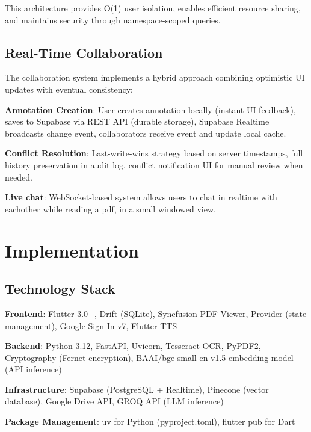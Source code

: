 \documentclass[conference]{IEEEtran}
\begin{document}
This architecture provides O(1) user isolation, enables efficient resource sharing, and maintains security through namespace-scoped queries.

\subsection{Real-Time Collaboration}

The collaboration system implements a hybrid approach combining optimistic UI updates with eventual consistency:

\textbf{Annotation Creation}: User creates annotation locally (instant UI feedback), saves to Supabase via REST API (durable storage), Supabase Realtime broadcasts change event, collaborators receive event and update local cache.

\textbf{Conflict Resolution}: Last-write-wins strategy based on server timestamps, full history preservation in audit log, conflict notification UI for manual review when needed.

\textbf{Live chat}: WebSocket-based system allows users to chat in realtime with eachother while reading a pdf, in a small windowed view.


\section{Implementation}

\subsection{Technology Stack}

\textbf{Frontend}: Flutter 3.0+, Drift (SQLite), Syncfusion PDF Viewer, Provider (state management), Google Sign-In v7, Flutter TTS

\textbf{Backend}: Python 3.12, FastAPI, Uvicorn, Tesseract OCR, PyPDF2, Cryptography (Fernet encryption), BAAI/bge-small-en-v1.5 embedding model (API inference)

\textbf{Infrastructure}: Supabase (PostgreSQL + Realtime), Pinecone (vector database), Google Drive API, GROQ API (LLM inference)

\textbf{Package Management}: uv for Python (pyproject.toml), flutter pub for Dart
\end{document}
